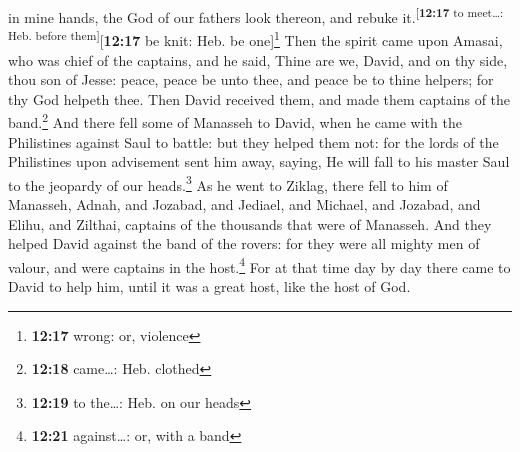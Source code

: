 in mine hands, the God of our fathers look thereon, and rebuke
it.\textsuperscript{{[}\textbf{12:17} to meet\ldots: Heb. before
them{]}}{[}\textbf{12:17} be knit: Heb. be one{]}\footnote{\textbf{12:17}
  wrong: or, violence}  Then the spirit came upon Amasai,
who was chief of the captains, and he said, Thine are we, David, and on
thy side, thou son of Jesse: peace, peace be unto thee, and peace be to
thine helpers; for thy God helpeth thee. Then David received them, and
made them captains of the band.\footnote{\textbf{12:18} came\ldots: Heb.
  clothed}  And there fell some of Manasseh to David,
when he came with the Philistines against Saul to battle: but they
helped them not: for the lords of the Philistines upon advisement sent
him away, saying, He will fall to his master Saul to the jeopardy of our
heads.\footnote{\textbf{12:19} to the\ldots: Heb. on our heads}
 As he went to Ziklag, there fell to him of Manasseh,
Adnah, and Jozabad, and Jediael, and Michael, and Jozabad, and Elihu,
and Zilthai, captains of the thousands that were of Manasseh.
 And they helped David against the band of the rovers:
for they were all mighty men of valour, and were captains in the
host.\footnote{\textbf{12:21} against\ldots: or, with a band}
 For at that time day by day there came to David to help
him, until it was a great host, like the host of God.

